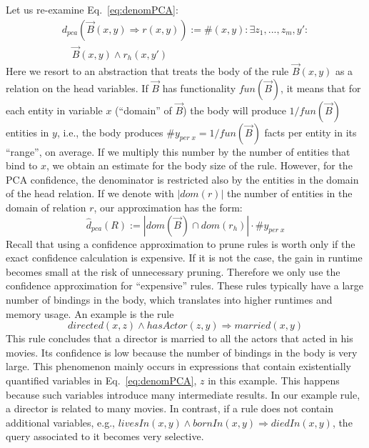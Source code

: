 {Let us re-examine Eq.~\ref{eq:denomPCA}:
\[
\begin{array}{rl}
 d_{pca}(\vec{B}(x,y) \Rightarrow r(x,y)) := {} \#(x,y): \exists z_1,...,z_m,y': \\ \quad \vec{B}(x, y) \wedge r_h(x,y')
\end{array}
\]
Here we resort to an abstraction that treats the body of the rule $\vec{B}(x, y)$ as a relation
on the head variables. If $\vec{B}$ has functionality $fun(\vec{B})$, it means that for each entity in variable $x$ (``domain'' of $\vec{B}$) the body will produce $1/fun(\vec{B})$ entities in $y$,
i.e., the body produces $\#y_{per\; x} = 1/fun(\vec{B})$ facts per entity in its ``range'', on average. If we multiply this number
by the number of entities that bind to $x$,
we obtain an estimate for the body size of the rule. However, for the PCA confidence, the denominator is restricted also by the entities in the domain of the head relation.
If we denote with $|dom(r)|$ the number of entities in the domain of relation $r$, our approximation has the form:
\begin{equation} \label{eq:pcaApproxConf_general}
  \widehat{d}_{pca}(R):=|dom(\vec{B}) \cap dom(r_h)|\cdot \#y_{per\; x}
\end{equation}
Recall that using a confidence approximation to prune rules is worth only if 
the exact confidence calculation is expensive. 
If it is not the case, the gain in runtime becomes small at the risk of unnecessary pruning.
Therefore we only use the confidence approximation for ``expensive'' rules. 
These rules typically have a large number of bindings in the body, which translates into 
higher runtimes and memory usage. An example is the rule 
\[
 directed(x,z) \wedge hasActor(z,y) \Rightarrow married(x,y)
\]
This rule concludes that a director is married to all the actors that acted in his movies. Its
confidence is low because the number of bindings in the body is very large. 
This phenomenon mainly occurs in expressions that contain existentially quantified variables in Eq.~\ref{eq:denomPCA}, 
$z$ in this example. This happens because such variables introduce many intermediate results. In our example
rule, a director is related to many movies. In contrast, if a rule does not contain additional variables, 
e.g., $livesIn(x,y)\wedge bornIn(x,y)\Rightarrow diedIn(x,y)$, the query associated to it becomes very selective.

}
